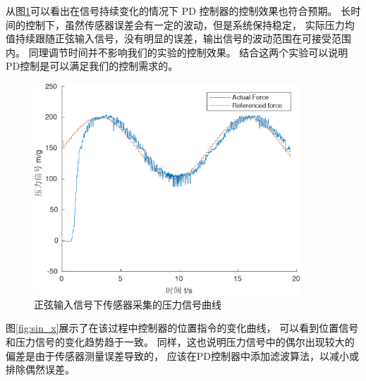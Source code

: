 

从图\ref{fig:sin}可以看出在信号持续变化的情况下 PD 控制器的控制效果也符合预期。
长时间的控制下，虽然传感器误差会有一定的波动，但是系统保持稳定，
实际压力均值持续跟随正弦输入信号，没有明显的误差，输出信号的波动范围在可接受范围内。
同理调节时间并不影响我们的实验的控制效果。
结合这两个实验可以说明 PD控制是可以满足我们的控制需求的。

\begin{figure}[!ht]
  \centering
  \includegraphics[width=10cm]{chapter04/pic/sin}
  \caption{\label{fig:sin}
    正弦输入信号下传感器采集的压力信号曲线}
  \vspace{-0.3cm}
\end{figure}

图\ref{fig:sin_x}展示了在该过程中控制器的位置指令的变化曲线，
可以看到位置信号和压力信号的变化趋势趋于一致。
同样，这也说明压力信号中的偶尔出现较大的偏差是由于传感器测量误差导致的，
应该在PD控制器中添加滤波算法，以减小或排除偶然误差。

